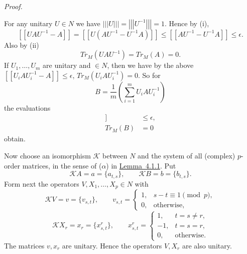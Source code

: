 \documentclass[b5paper,twoside]{article}
\newcommand{\lemref}[2]{\hyperref[#1]{\mbox{Lemma~#2}}}
\theoremstyle{mvnplain}
\renewenvironment{proof}[1][Proof]{%
  \par\addvspace{0.35\baselineskip}%
  \noindent\textit{#1.}\ \normalfont\ignorespaces
}{%
  \par\addvspace{0.35\baselineskip}%
}
\newcommand{\M}{\mathbf M}
\newcommand{\N}{\mathbf N}
\newcommand{\Metric}[1]{\left[\!\left[#1\right]\!\right]}
\newcommand{\OpNorm}[1]{\left\lvert\left\lvert\left\lvert#1\right\rvert\right\rvert\right\rvert}
\def\M{M}%
\def\N{N}%
\def\Metric#1{[[#1]]}%
\def\operatorname#1{#1}%
\begin{document}
\begin{proof}
For any unitary \(U\in\N\) we have
\(\OpNorm{U}=\OpNorm{U^{-1}}=1\). Hence by (i),
\[
 \Metric{UAU^{-1}-A}
 =\Metric{U(AU^{-1}-U^{-1}A)}
 \leq\Metric{AU^{-1}-U^{-1}A}\leq\epsilon.
\]
Also by (ii)
\[
 \operatorname{Tr}_{\M}(UAU^{-1})=\operatorname{Tr}_{\M}(A)=0.
\]
If \(U_1,\ldots,U_m\) are unitary and \(\in\N\), then we have by the above
\(\Metric{U_iAU_i^{-1}-A}\leq\epsilon\),
\(\operatorname{Tr}_{\M}(U_iAU_i^{-1})=0\). So for
\begin{equation}\tag{4.7.\(\alpha\)}\label{eq:4.7-alpha}
 B=\frac1m\left(\sum_{i=1}^{m}U_iAU_i^{-1}\right)
\end{equation}
the evaluations
\begin{align}
 \Metric{B-A}&\leq\epsilon,
   \tag{4.7.\(\beta\)}\label{eq:4.7-beta}\\
 \operatorname{Tr}_{\M}(B)&=0
   \tag{4.7.\(\gamma\)}\label{eq:4.7-gamma}
\end{align}
obtain.

Now choose an isomorphism \(\mathcal K\) between \(\N\) and the system of
all (complex) \(p\)-order matrices, in the sense of (\(\alpha\)) in
\lemref{lem:4.1.1}{4.1.1}. Put
\[
 \mathcal KA=a=\{a_{t,s}\},\qquad
 \mathcal KB=b=\{b_{t,s}\}.
\]
Form next the operators \(V,X_1,\ldots,X_p\in\N\) with
\[
 \mathcal KV=v=\{v_{s,t}\},\qquad
 v_{s,t}=\begin{cases}
 1,&s-t\equiv1\pmod p,\\
 0,&\text{otherwise},
 \end{cases}
\]
\[
 \mathcal KX_r=x_r=\{x^{r}_{s,t}\},\qquad
 x^{r}_{s,t}=\begin{cases}
 1,&t=s\ne r,\\
 -1,&t=s=r,\\
 0,&\text{otherwise}.
 \end{cases}
\]
The matrices \(v,x_r\) are unitary. Hence the operators \(V,X_r\) are also
unitary.


\end{proof}
\end{document}
